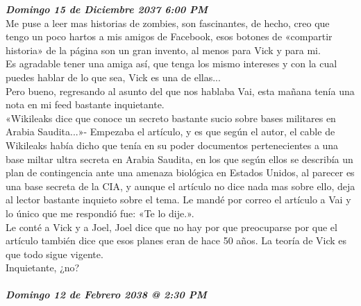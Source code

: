 \textbf{\textit{Domingo 15 de Diciembre 2037 6:00 PM\\[1.5cm]}}
Me puse a leer mas historias de zombies, son fascinantes, de hecho, creo que tengo un poco hartos a mis amigos de Facebook, esos botones de «compartir historia» de la página son un gran invento, al menos para Vick y para mi.\\
Es agradable tener una amiga así, que tenga los mismo intereses y con la cual puedes hablar de lo que sea, 
Vick es una de ellas...\\
Pero bueno, regresando al asunto del que nos hablaba Vai, esta mañana tenía una nota en mi feed bastante inquietante.\\
«Wikileaks dice que conoce un secreto bastante sucio sobre bases militares en Arabia Saudita...»- Empezaba el artículo, y es que según el autor, el cable de Wikileaks había dicho que tenía en su poder documentos 
pertenecientes a una base miltar ultra secreta en Arabia Saudita, en los que según ellos se describía un plan 
de contingencia ante una amenaza biológica en Estados Unidos, al parecer es una base secreta de la CIA, y 
aunque el artículo no dice nada mas sobre ello, deja al lector bastante inquieto sobre el tema. Le mandé por 
correo el artículo a Vai y lo único que me respondió fue: «Te lo dije.».\\
Le conté a Vick y a Joel, Joel dice que no hay por que preocuparse por que el artículo también dice que esos 
planes eran de hace 50 años. La teoría de Vick es que todo sigue vigente.\\
Inquietante, ¿no? \\\\


\textbf{\textit{Domingo 12 de Febrero 2038 @ 2:30 PM}}\\\\[1.5cm]

